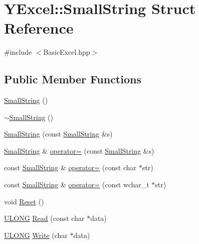 \hypertarget{struct_y_excel_1_1_small_string}{}\section{Y\+Excel\+:\+:Small\+String Struct Reference}
\label{struct_y_excel_1_1_small_string}


{\ttfamily \#include $<$Basic\+Excel.\+hpp$>$}

\subsection*{Public Member Functions}
\begin{DoxyCompactItemize}
\item 
\hyperlink{struct_y_excel_1_1_small_string_a5e14f04bfdfcb18ae102a51ca56bb5b9}{Small\+String} ()
\item 
\hyperlink{struct_y_excel_1_1_small_string_ac08fc1975549d73e76f8fede26f7df32}{$\sim$\+Small\+String} ()
\item 
\hyperlink{struct_y_excel_1_1_small_string_a43392143c24f2cc2d638d95c48ec14b7}{Small\+String} (const \hyperlink{struct_y_excel_1_1_small_string}{Small\+String} \&s)
\item 
\hyperlink{struct_y_excel_1_1_small_string}{Small\+String} \& \hyperlink{struct_y_excel_1_1_small_string_a9535227ca675bca24a48cc0e4e7ecf7f}{operator=} (const \hyperlink{struct_y_excel_1_1_small_string}{Small\+String} \&s)
\item 
const \hyperlink{struct_y_excel_1_1_small_string}{Small\+String} \& \hyperlink{struct_y_excel_1_1_small_string_ad3aba2c8a0159502ef0023b2cba4fb31}{operator=} (const char $\ast$str)
\item 
const \hyperlink{struct_y_excel_1_1_small_string}{Small\+String} \& \hyperlink{struct_y_excel_1_1_small_string_ad7b0e90d4549c96f184a562d65055dca}{operator=} (const wchar\+\_\+t $\ast$str)
\item 
void \hyperlink{struct_y_excel_1_1_small_string_a56c6858401c4fb21fa1bd4dd8c7da420}{Reset} ()
\item 
\hyperlink{_basic_excel_8hpp_abe09d1bea023be6a07cbadde8e955435}{U\+L\+O\+N\+G} \hyperlink{struct_y_excel_1_1_small_string_acd78382b8d66e34bc669b094c4cd52df}{Read} (const char $\ast$data)
\item 
\hyperlink{_basic_excel_8hpp_abe09d1bea023be6a07cbadde8e955435}{U\+L\+O\+N\+G} \hyperlink{struct_y_excel_1_1_small_string_a3ffb2e72c35b0c42eefd218f91241aa1}{Write} (char $\ast$data)

\end{DoxyCompactItemize}

